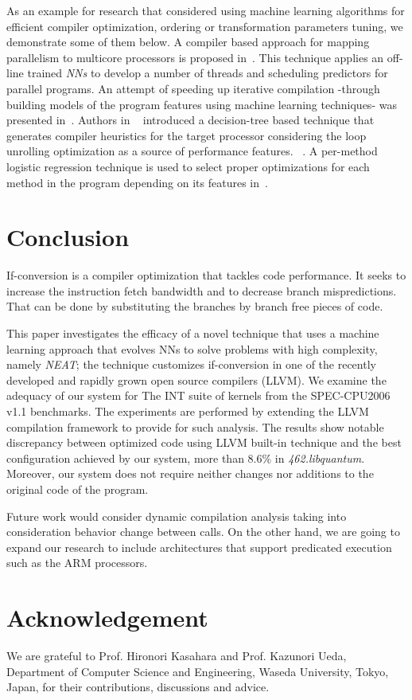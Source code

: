 \documentclass[preprint,nocopyrightspace]{sigplanconf}
\begin{document}
As an example for research that considered using machine learning algorithms for efficient compiler optimization,  ordering or transformation parameters tuning, we demonstrate some of them below.
A compiler based approach for mapping parallelism to multicore processors is proposed in~\cite{wang2009mapping}. This technique applies an off-line trained \textit{NNs} to develop a number of threads and scheduling predictors for parallel programs. 
An attempt of speeding up iterative compilation -through building models of the program features using machine learning techniques- was presented in~\cite{agakov2006using}.
Authors in ~\cite{monsifrot2002machine} introduced a decision-tree based technique that generates compiler heuristics for the target processor considering the loop unrolling optimization as a source of performance features.
~\cite{yotov2003comparison}.
A per-method logistic regression technique is used to select proper optimizations for each method in the program depending on its features in~\cite{cavazos2006method}.


\section{Conclusion}
\label{conclusion}
If-conversion is a compiler optimization that tackles code performance. It seeks to increase the instruction fetch bandwidth and to decrease branch mispredictions. That can be done by substituting the branches by branch free pieces of code.

This paper investigates the efficacy of a novel technique that uses a machine learning approach that  evolves NNs to solve problems with high complexity, namely \textit{NEAT}; the technique customizes if-conversion in one of the recently developed and rapidly grown open source compilers (LLVM). We examine the adequacy of our system for The INT suite of kernels from the SPEC-CPU2006 v1.1 benchmarks.
 The experiments are performed by extending the LLVM compilation framework to provide for such analysis. The results show notable discrepancy between optimized code using LLVM built-in technique and the best configuration achieved by our system, more than 8.6\% in \textit{462.libquantum}. Moreover, our system does not require neither changes nor additions to the original code of the program. 

Future work would consider dynamic compilation analysis taking into consideration behavior change between calls. On the other hand, we are going to expand our research to include architectures that support predicated execution such as the ARM processors.




\section{Acknowledgement}
We are grateful to Prof. Hironori Kasahara and Prof. Kazunori Ueda, Department of Computer Science and Engineering, Waseda University, Tokyo, Japan, for their contributions, discussions and advice.




\end{document}

